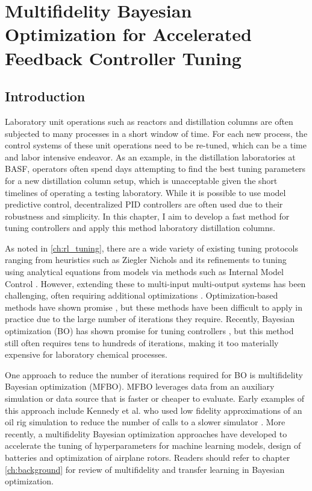 \chapter{Multifidelity Bayesian Optimization for Accelerated Feedback Controller Tuning}\label{ch:mfbo} 

\section{Introduction}
\label{sec:intro}
Laboratory unit operations such as reactors and distillation columns  are often subjected to many processes in a short window of time. For each new process, the control systems of these unit operations need to be re-tuned, which can be a time and labor intensive endeavor. As an example, in the distillation laboratories at BASF, operators often spend days attempting to find the best tuning parameters for a new distillation column setup, which is unacceptable given the short timelines of operating a testing laboratory. While it is possible to use model predictive control, decentralized PID controllers are often used due to their robustness and simplicity. In this chapter, I aim to develop a fast method for tuning controllers and apply this method laboratory distillation columns.

As noted in \ref{ch:rl_tuning}, there are a wide variety of existing tuning protocols ranging from heuristics such as Ziegler Nichols \cite{Ziegler1942} and its refinements \cite{Hang1991} to tuning using analytical equations from models via methods such as  Internal Model Control \cite{Copeland2010}. However, extending these to multi-input multi-output systems has been challenging, often requiring additional optimizations \cite{Nandong2013, Nandong2015}. Optimization-based methods have shown promise \cite{Pajares2019, Sumana2010, Rajapandiyan2012, Behroozsarand2012}, but these methods have been difficult to apply in practice due to the large number of iterations they require. Recently, Bayesian optimization (BO) has shown promise for tuning controllers \cite{NeumannBrosig2020, Fiducioso2019, Khosravi2020, Konig2020, Fujimoto2022, Brunzema2022, Khosravi2022}, but this method still often requires tens to hundreds of iterations, making it too materially expensive for laboratory chemical processes.

One approach to reduce the number of iterations required for BO is multifidelity Bayesian optimization (MFBO). MFBO leverages data from an auxiliary simulation or data source that is faster or cheaper to evaluate. Early examples of this approach include Kennedy et al. who used low fidelity approximations of an oil rig simulation to reduce the number of calls to a slower simulator \cite{Kennedy2000}. More recently, a multifidelity Bayesian optimization approaches have developed to accelerate the tuning of hyperparameters for machine learning models, design of batteries and optimization of airplane rotors. Readers should refer to chapter \ref{ch:background} for review of multifidelity and transfer learning in Bayesian optimization.

